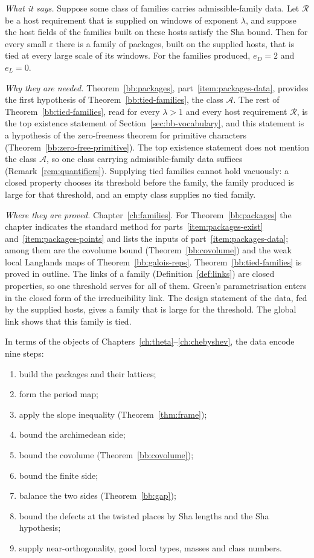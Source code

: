 \documentclass[11pt]{amsbook}
\theoremstyle{plain}
\theoremstyle{definition}
\theoremstyle{remark}
\numberwithin{equation}{section}
\numberwithin{figure}{chapter}
\numberwithin{table}{chapter}
\newcommand{\eps}{\varepsilon}
\begin{document}
\noindent\emph{What it says.} Suppose some class of families carries
admissible-family data. Let $\mathscr R$ be a host requirement that
is supplied on windows of exponent $\lambda$, and suppose the host
fields of the families built on these hosts satisfy the Sha bound.
Then for every small $\eps$ there is a family of packages, built on
the supplied hosts, that is tied at every large scale of its windows.
For the families produced, $e_D=2$ and $e_L=0$.

\noindent\emph{Why they are needed.} Theorem~\ref{bb:packages},
part~\ref{item:packages-data}, provides the first hypothesis of
Theorem~\ref{bb:tied-families}, the class $\mathcal A$. The rest of
Theorem~\ref{bb:tied-families}, read for every $\lambda>1$ and every
host requirement $\mathscr R$, is the top existence statement of
Section~\ref{sec:bb-vocabulary}, and this statement is a hypothesis
of the zero-freeness theorem for primitive characters
(Theorem~\ref{bb:zero-free-primitive}). The top existence
statement does not mention the class $\mathcal A$, so one class
carrying admissible-family data suffices
(Remark~\ref{rem:quantifiers}). Supplying tied families cannot hold
vacuously: a closed property chooses its threshold before the family,
the family produced is large for that threshold, and an empty class
supplies no tied family.

\noindent\emph{Where they are proved.} Chapter~\ref{ch:families}.
For Theorem~\ref{bb:packages} the chapter indicates the standard
method for parts~\ref{item:packages-exist}
and~\ref{item:packages-points} and lists the inputs of
part~\ref{item:packages-data}; among them are the covolume bound
(Theorem~\ref{bb:covolume}) and the weak local Langlands maps of
Theorem~\ref{bb:galois-reps}. Theorem~\ref{bb:tied-families} is
proved in outline. The links of a family
(Definition~\ref{def:links}) are closed properties, so one threshold
serves for all of them. Green's parametrisation enters in the closed
form of the irreducibility link. The design statement of the data,
fed by the supplied hosts, gives a family that is large for the
threshold. The global link shows that this family is tied.

In terms of the objects of
Chapters~\ref{ch:theta}--\ref{ch:chebyshev}, the data encode nine
steps:
\begin{enumerate}[label=(\arabic*)]
\item build the packages and their lattices;
\item form the period map;
\item apply the slope inequality (Theorem~\ref{thm:frame});
\item bound the archimedean side;
\item bound the covolume (Theorem~\ref{bb:covolume});
\item bound the finite side;
\item balance the two sides (Theorem~\ref{bb:gap});
\item bound the defects at the twisted places by Sha lengths and
the Sha hypothesis;
\item supply near-orthogonality, good local types, masses and class
numbers.
\end{enumerate}
\end{document}
